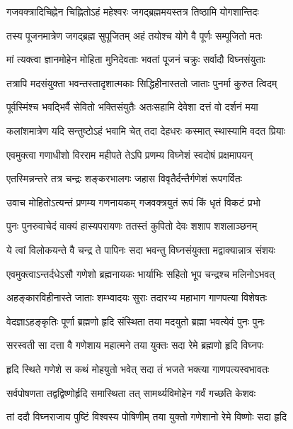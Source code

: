 \twolineshloka
{गजवक्त्रादिचिह्नेन चिह्नितोऽहं महेश्वरः}
{जगद्ब्रह्ममयस्तत्र तिष्ठामि योगशान्तिदः} %

\twolineshloka
{तस्य पूजनमात्रेण जगद्ब्रह्म सुपूजितम्}
{अहं तयोश्च योगे वै पूर्णः सम्पूजितो मतः} %

\twolineshloka
{मां त्यक्त्वा ज्ञानमोहेन मोहिता मुनिदेवताः}
{भवतां पूजनं चक्रुः सर्वादौ विघ्नसंयुताः} %

\twolineshloka
{तत्रापि मदसंयुक्ता भवन्तस्तादृशात्मकाः}
{सिद्धिहीनास्ततो जाताः पुनर्मा कुरुत त्विदम्} %

\twolineshloka
{पूर्वस्मिंश्च भवद्भिर्वै सेवितो भक्तिसंयुतैः}
{अतःसहामि देवेशा दत्तं वो दर्शनं मया} %

\twolineshloka
{कलांशमात्रेण यदि सन्तुष्टोऽहं भवामि चेत्}
{तदा देहधरः कस्मात् स्थास्यामि वदत प्रियाः} %

\twolineshloka
{एवमुक्त्वा गणाधीशो विरराम महीपते}
{तेऽपि प्रणम्य विघ्नेशं स्वदोषं प्रक्षमापयन्} %

\twolineshloka
{एतस्मिन्नन्तरे तत्र चन्द्रः शङ्करभालगः}
{जहास विवृतैर्दन्तैर्गणेशं रूपगर्वितः} %

\twolineshloka
{उवाच मोहितोऽत्यन्तं प्रणम्य गणनायकम्}
{गजवक्त्रयुतं रूपं किं धृतं विकटं प्रभो} %

\twolineshloka
{पुनः पुनरुवाचेदं वाक्यं हास्यपरायणः}
{ततस्तं कुपितो देवः शशाप शशलाञ्छनम्} %

\twolineshloka
{ये त्वां विलोकयन्ते वै चन्द्र ते पापिनः सदा}
{भवन्तु विघ्नसंयुक्ता मद्वाक्यान्नात्र संशयः} %

\twolineshloka
{एवमुक्त्वाऽन्तर्दधेऽसौ गणेशो ब्रह्मनायकः}
{भार्याभिः सहितो भूप चन्द्रश्च मलिनोऽभवत्} %

\twolineshloka
{अहङ्कारविहीनास्ते जाताः शम्भ्वादयः सुराः}
{तदारभ्य महाभाग गाणपत्या विशेषतः} %

\twolineshloka
{वेदज्ञाऽहङ्कृतिः पूर्णा ब्रह्मणो हृदि संस्थिता}
{तया मदयुतो ब्रह्मा भवत्येवं पुनः पुनः} %

\twolineshloka
{सरस्वती सा दत्ता वै गणेशाय महात्मने}
{तया युक्तः सदा रेमे ब्रह्मणो हृदि विघ्नपः} %

\twolineshloka
{हृदि स्थिते गणेशे स कथं मोहयुतो भवेत्}
{सदा तं भजते भक्त्या गाणपत्यस्वभावतः} %

\twolineshloka
{सर्वपोषणता तद्वद्विष्णोर्हृदि समास्थिता}
{तत् सामर्थ्यविमोहेन गर्वं गच्छति केशवः} %

\twolineshloka
{तां ददौ विघ्नराजाय पुष्टिं विश्वस्य पोषिणीम्}
{तया युक्तो गणेशानो रेमे विष्णोः सदा हृदि} %

